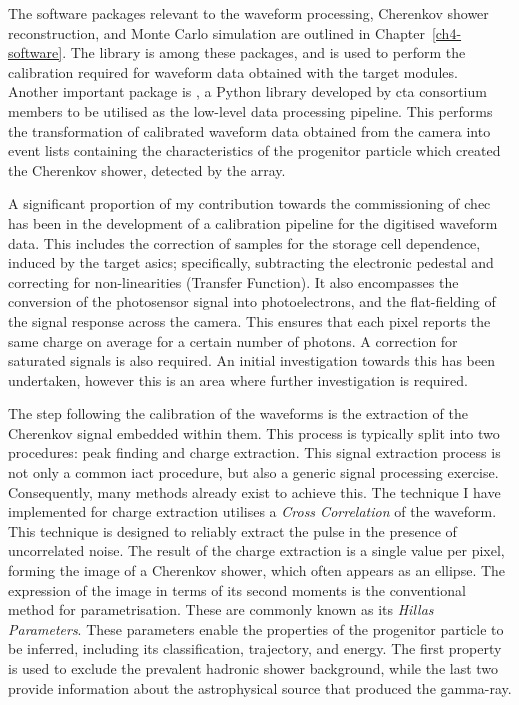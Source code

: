 The software packages relevant to the waveform processing, Cherenkov shower reconstruction, and Monte Carlo simulation are outlined in Chapter~\ref{ch4-software}. The  library is among these packages, and is used to perform the calibration required for waveform data obtained with the \gls{target} modules. Another important package is , a Python library developed by \gls{cta} consortium members to be utilised as the low-level data processing pipeline. This performs the transformation of calibrated waveform data obtained from the camera into event lists containing the characteristics of the progenitor particle which created the Cherenkov shower, detected by the array.

A significant proportion of my contribution towards the commissioning of \gls{chec} has been in the development of a calibration pipeline for the digitised waveform data. This includes the correction of samples for the storage cell dependence, induced by the \gls{target} \glspl{asic}; specifically, subtracting the electronic pedestal and correcting for non-linearities (Transfer Function). It also encompasses the conversion of the photosensor signal into photoelectrons, and the flat-fielding of the signal response across the camera. This ensures that each pixel reports the same charge on average for a certain number of photons. A correction for saturated signals is also required. An initial investigation towards this has been undertaken, however this is an area where further investigation is required.

The step following the calibration of the waveforms is the extraction of the Cherenkov signal embedded within them. This process is typically split into two procedures: peak finding and charge extraction. This signal extraction process is not only a common \gls{iact} procedure, but also a generic signal processing exercise. Consequently, many methods already exist to achieve this. The technique I have implemented for charge extraction utilises a \textit{Cross Correlation} of the waveform. This technique is designed to reliably extract the pulse in the presence of uncorrelated noise. The result of the charge extraction is a single value per pixel, forming the image of a Cherenkov shower, which often appears as an ellipse. The expression of the image in terms of its second moments is the conventional method for parametrisation. These are commonly known as its \textit{Hillas Parameters}. These parameters enable the properties of the progenitor particle to be inferred, including its classification, trajectory, and energy. The first property is used to exclude the prevalent hadronic shower background, while the last two provide information about the astrophysical source that produced the gamma-ray.


